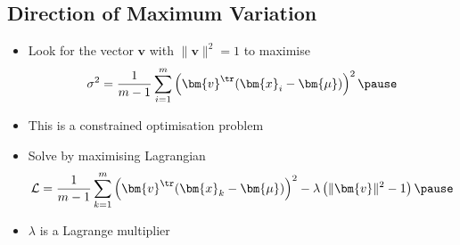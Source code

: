 \begin{slide}
\section{Direction of Maximum Variation}

\begin{PauseHighLight}
  \begin{itemize}
  \item Look for the vector $\bm{v}$ with $\|\bm{v}\|^2=1$ to maximise
    \begin{align*}
      \sigma^2 = \frac{1}{m-1} \sum_{i=1}^m \left( \bm{v}^\tr
      (\bm{x}_i-\bm{\mu}) \right)^2\pause
    \end{align*}
  \item This is a constrained optimisation problem\pause
  \item Solve by maximising Lagrangian
    \begin{align*}
      \mathcal{L} = \frac{1}{m-1} \sum_{k=1}^m \left( \bm{v}^\tr
      (\bm{x}_k-\bm{\mu}) \right)^2 - \lambda \left(\|\bm{v}\|^2-1\right)\pause
    \end{align*}
  \item $\lambda$ is a Lagrange multiplier\pause
  \end{itemize}
\end{PauseHighLight}

\end{slide}



